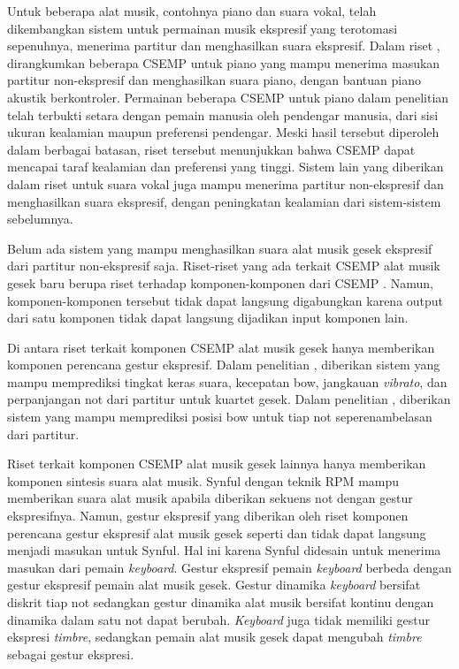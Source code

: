 Untuk beberapa alat musik, contohnya piano dan suara vokal, telah dikembangkan sistem untuk permainan musik ekspresif yang terotomasi sepenuhnya, menerima partitur dan menghasilkan suara ekspresif. Dalam riset \citet{schubert2017test}, dirangkumkan beberapa CSEMP untuk piano yang mampu menerima masukan partitur non-ekspresif dan menghasilkan suara piano, dengan bantuan piano akustik berkontroler. Permainan beberapa CSEMP untuk piano dalam penelitian \citet{schubert2017test} telah terbukti setara dengan pemain manusia oleh pendengar manusia, dari sisi ukuran kealamian maupun preferensi pendengar. Meski hasil tersebut diperoleh dalam berbagai batasan, riset tersebut menunjukkan bahwa CSEMP dapat mencapai taraf kealamian dan preferensi yang tinggi. Sistem lain yang diberikan dalam riset \citet{bonada2017singing} untuk suara vokal juga mampu menerima partitur non-ekspresif dan menghasilkan suara ekspresif, dengan peningkatan kealamian dari sistem-sistem sebelumnya.

Belum ada sistem yang mampu menghasilkan suara alat musik gesek ekspresif dari partitur non-ekspresif saja. Riset-riset yang ada terkait CSEMP alat musik gesek baru berupa riset terhadap komponen-komponen dari CSEMP \parencite{marchini2014quartet} \parencite{yu2017bowing} \parencite{lindemann2007rpm} \parencite{yang2016synthesis} \parencite{nsynth2017}. Namun, komponen-komponen tersebut tidak dapat langsung digabungkan karena output dari satu komponen tidak dapat langsung dijadikan input komponen lain.

Di antara riset terkait komponen CSEMP alat musik gesek hanya memberikan komponen perencana gestur ekspresif. Dalam penelitian \citet{marchini2014quartet}, diberikan sistem yang mampu memprediksi tingkat keras suara, kecepatan bow, jangkauan \textit{vibrato}, dan perpanjangan not dari partitur untuk kuartet gesek. Dalam penelitian \citet{yu2017bowing}, diberikan sistem yang mampu memprediksi posisi bow untuk tiap not seperenambelasan dari partitur.

Riset terkait komponen CSEMP alat musik gesek lainnya hanya memberikan komponen sintesis suara alat musik. Synful dengan teknik RPM \parencite{lindemann2007rpm} mampu memberikan suara alat musik apabila diberikan sekuens not dengan gestur ekspresifnya. Namun, gestur ekspresif yang diberikan oleh riset komponen perencana gestur ekspresif alat musik gesek seperti \parencite{marchini2014quartet} dan \parencite{yu2017bowing} tidak dapat langsung menjadi masukan untuk Synful. Hal ini karena Synful didesain untuk menerima masukan dari pemain \textit{keyboard}. Gestur ekspresif pemain \textit{keyboard} berbeda dengan gestur ekspresif pemain alat musik gesek. Gestur dinamika \textit{keyboard} bersifat diskrit tiap not sedangkan gestur dinamika alat musik bersifat kontinu dengan dinamika dalam satu not dapat berubah. \textit{Keyboard} juga tidak memiliki gestur ekspresi \textit{timbre}, sedangkan pemain alat musik gesek dapat mengubah \textit{timbre} sebagai gestur ekspresi.


